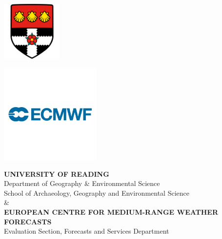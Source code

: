 \documentclass{thesis} %
\begin{document}

\frontmatter %



\begin{titlepage}
    \vspace*{-4cm} %
    \begin{center}
        
        \begin{minipage}[c]{0.4\textwidth} %
            \includegraphics[width=3cm]{general_figures/uorlogo.png}
        \end{minipage}%
        \hspace{2cm} %
        \begin{minipage}[c]{0.4\textwidth} %
            \includegraphics[width=5cm]{general_figures/ecmwf_logo.jpg}
        \end{minipage}
        
        {\large\bfseries UNIVERSITY OF READING}\\
        {\large  Department of Geography \& Environmental Science\\
        School of Archaeology, Geography and Environmental Science}\\[0.5cm]
        {\&}\\[0.5cm]
        {\large\bfseries EUROPEAN CENTRE FOR MEDIUM-RANGE WEATHER FORECASTS}\\
        {\large  Evaluation Section, Forecasts and Services Department}\\[2.5cm]
        

\end{center}
\end{titlepage}
\end{document}

